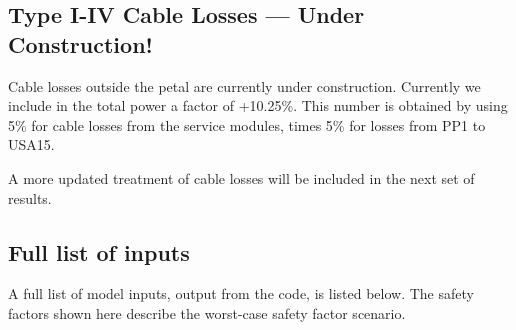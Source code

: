 \subsection{Type I-IV Cable Losses --- Under Construction!}

Cable losses outside the petal are currently under construction. Currently we include in the
total power a factor of +10.25\%. This number is obtained by using 5\% for cable losses from the
service modules, times 5\% for losses from PP1 to USA15.

A more updated treatment of cable losses will be included in the next set of results.

\subsection{Full list of inputs}

A full list of model inputs, output from the code, is listed below. The safety factors shown here
describe the worst-case safety factor scenario.

